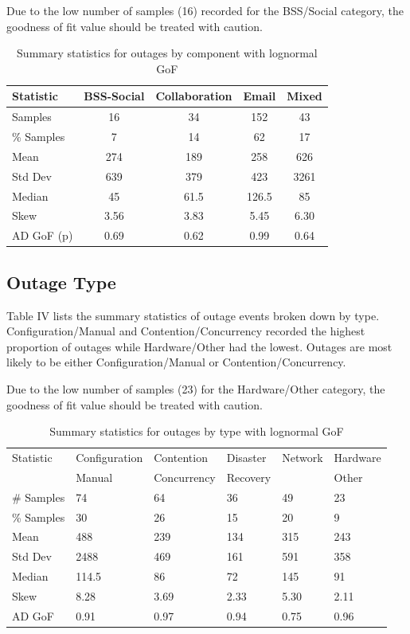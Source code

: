 \documentclass[conference]{IEEEtran}
\begin{document}
Due to the low number of samples (16) recorded for the BSS/Social category, the goodness of fit value should be treated with caution. \par


\begin {table}
\caption {Summary statistics for outages by component with lognormal GoF} 
\begin{center}
\begin{tabular}{l | c | c | c | c} Statistic & BSS-Social & Collaboration & Email & Mixed
\\ \hline Samples & 16 & 34 & 152 & 43
\\ \% Samples & 7 & 14 & 62 & 17
\\ Mean & 274 & 189 & 258 & 626
\\ Std Dev & 639 & 379 & 423 & 3261
\\ Median & 45	& 61.5 & 126.5 & 85
\\ Skew & 3.56	& 3.83 & 5.45 & 6.30
\\AD GoF (p) & 0.69 & 0.62 & 0.99 & 0.64
\end{tabular}
\end{center}
\end{table}


\subsection{Outage Type}

Table IV lists the summary statistics of outage events broken down by type. Configuration/Manual and Contention/Concurrency recorded the highest proportion of outages while Hardware/Other had the lowest. Outages are most likely to be either Configuration/Manual or Contention/Concurrency. 

Due to the low number of samples (23) for the Hardware/Other category, the goodness of fit value should be treated with caution. \par


\begin {table}
\caption {Summary statistics for outages by type with lognormal GoF} 
\begin{center}
\begin{tabular}{p{1.26cm} |  p{1.3cm} | p{1.3cm} | p{0.9cm} | p{0.9cm} | p{1cm}} Statistic & Configuration & Contention & Disaster & Network & Hardware
\\ & Manual & Concurrency &  Recovery & & Other
\\ \hline \# Samples & 74 & 64 & 36 & 49 & 23
\\ \% Samples & 30 & 26 & 15 & 20 & 9
\\ Mean & 488 & 239 & 134 & 	315	& 243
\\ Std Dev & 2488	& 469 & 161	& 591 	& 358
\\ Median & 114.5	& 86	& 72	& 145	& 91
\\ Skew & 8.28	& 3.69	& 2.33	& 5.30	& 2.11
\\AD GoF  & 0.91 & 0.97 & 0.94 & 0.75 & 0.96
\end{tabular}
\end{center}
\end{table}
\end{document}
